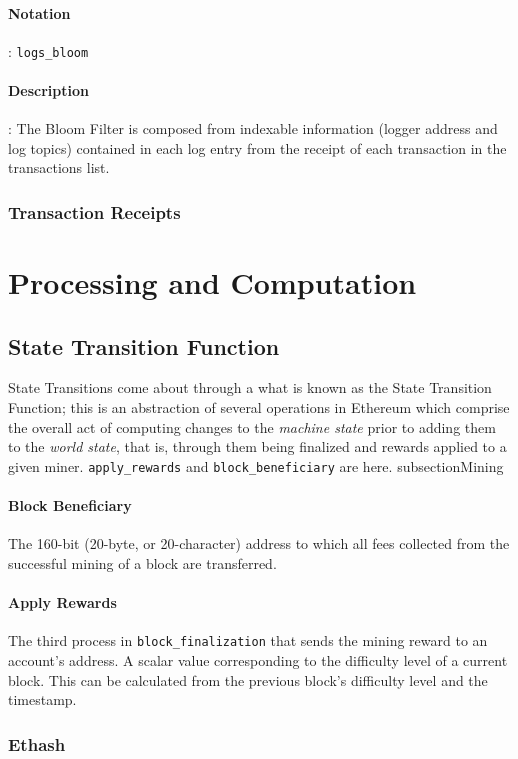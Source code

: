 \documentclass[10pt,a4paper,leqno,bibliography=totoc]{scrartcl}
\newenvironment{alphafootnotes}
{\par\edef\savedfootnotenumber{\number\value{footnote}}
\renewcommand{\thefootnote}{\alph{footnote}}
\setcounter{footnote}{0}}
{\par\setcounter{footnote}{\savedfootnotenumber}}
\begin{document}
\begin{alphafootnotes}
\begin{multicols*}{2}
				\paragraph{Notation}: \texttt{logs\_bloom}
				\paragraph{Description}: The Bloom Filter is composed from indexable information (logger address and log topics) contained in each log entry from the receipt of each transaction in the transactions list. 

		\subsubsection{Transaction Receipts}


	\section{Processing and Computation}
	
		\subsection{State Transition Function}
		State Transitions come about through a what is known as the State Transition Function; this is an abstraction of several operations in Ethereum which comprise the overall act of computing changes to the \textit{machine state} prior to adding them to the \textit{world state}, that is, through them being finalized and rewards applied to a given miner. \texttt{apply\_rewards} and \texttt{block\_beneficiary} are here.
		subsection{Mining}
			\paragraph{Block Beneficiary} The 160-bit (20-byte, or 20-character) address to which all fees collected from the successful mining of a block are transferred.
			\paragraph{Apply Rewards} The third process in \texttt{block\_finalization} that sends the mining reward to an account's address. A scalar value corresponding to the difficulty level of a current block. This can be calculated from the previous block's difficulty level and the timestamp. 

			\subsubsection{Ethash}
	

\end{multicols*}
\end{alphafootnotes}
\end{document}
